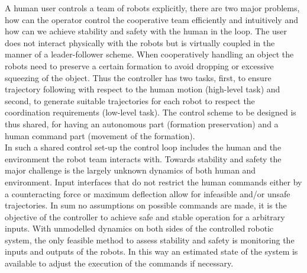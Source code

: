 \documentclass[a4paper,twoside, openright,12pt]{report}
\begin{document}

A human user controls a team of robots explicitly, there are two major problems, how can the operator control the cooperative team efficiently and intuitively and how can we achieve stability and safety with the human in the loop.  
The user does not interact physically with the robots but is virtually coupled in the manner of a leader-follower scheme. When cooperatively handling an object the robots need to preserve a certain formation to avoid dropping or excessive squeezing of the object. Thus the controller has two tasks, first, to ensure trajectory following with respect to the human motion (high-level task) and second, to generate suitable trajectories for each robot to respect the coordination requirements (low-level task). The control scheme to be designed is thus shared, for having an autonomous part (formation preservation) and a human command part (movement of the formation).\\
In such a shared control set-up the control loop includes the human and the environment the robot team interacts with. 
Towards stability and safety the major challenge is the largely unknown dynamics of both human and environment.
Input interfaces that do not restrict the human commands either by a counteracting force or maximum deflection allow for infeasible and/or unsafe trajectories. In sum no assumptions on possible commands are made, it is the objective of the controller to achieve safe and stable operation for a arbitrary inputs. With unmodelled dynamics on both sides of the controlled robotic system, the only feasible method to assess stability and safety is monitoring the inputs and outputs of the robots. In this way an estimated state of the system is available to adjust the execution of the commands if necessary.  
\end{document}
